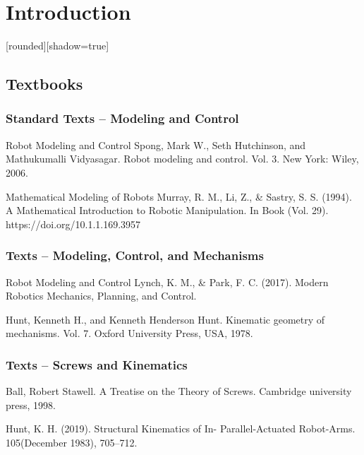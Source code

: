 \section{Introduction}

[rounded][shadow=true]
\subsection{Textbooks}
\begin{frame}
	\frametitle{Standard Texts -- Modeling and Control}
	\begin{block}{Robot Modeling and Control}
		Spong, Mark W., Seth Hutchinson, and Mathukumalli Vidyasagar. Robot modeling and control. Vol. 3. New York: Wiley, 2006.
	\end{block}
	\begin{block}{Mathematical Modeling of Robots}
		Murray, R. M., Li, Z., \& Sastry, S. S. (1994). A Mathematical Introduction to Robotic Manipulation. In Book (Vol. 29). https://doi.org/10.1.1.169.3957
	\end{block}
\end{frame}

\begin{frame}
	\frametitle{Texts -- Modeling, Control, and Mechanisms}
	\begin{block}{Robot Modeling and Control}
		Lynch, K. M., \& Park, F. C. (2017). Modern Robotics Mechanics, Planning, and Control.
	\end{block}
	\begin{tcolorbox}[coltitle=blue!50!black,colframe=blue!25,title=Mechanisms' Kinematic Geometry]
		Hunt, Kenneth H., and Kenneth Henderson Hunt. Kinematic geometry of mechanisms. Vol. 7. Oxford University Press, USA, 1978.
	\end{tcolorbox}
\end{frame}


\begin{frame}
	\frametitle{Texts -- Screws and Kinematics}
	\begin{tcolorbox}[coltitle=blue!50!black,colframe=blue!25,title=Screw Theory]
		Ball, Robert Stawell. A Treatise on the Theory of Screws. Cambridge university press, 1998.
	\end{tcolorbox}
	\begin{tcolorbox}[arc=4mm, 		coltitle=blue!50!black,colframe=blue!25,title=Mechanisms' Kinematic Geometry]
		Hunt, K. H. (2019). Structural Kinematics of In- Parallel-Actuated Robot-Arms. 105(December 1983), 705–712.
	\end{tcolorbox}
\end{frame}
